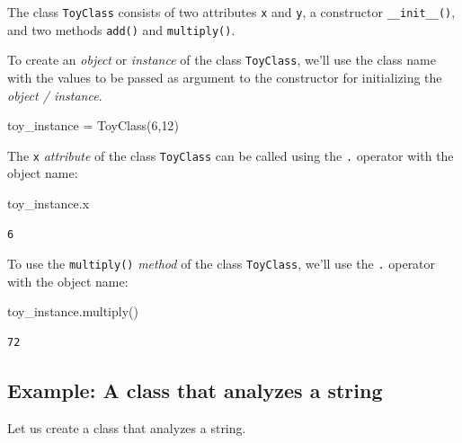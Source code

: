 \documentclass[
  letterpaper,
  DIV=11,
  numbers=noendperiod]{scrreprt}
\newenvironment{Shaded}{\begin{snugshade}}{\end{snugshade}}
\newcommand{\DecValTok}[1]{\textcolor[rgb]{0.68,0.00,0.00}{#1}}
\newcommand{\NormalTok}[1]{\textcolor[rgb]{0.00,0.23,0.31}{#1}}
\newcommand{\OperatorTok}[1]{\textcolor[rgb]{0.37,0.37,0.37}{#1}}
\begin{document}
The class \texttt{ToyClass} consists of two attributes \texttt{x} and
\texttt{y}, a constructor \texttt{\_\_init\_\_()}, and two methods
\texttt{add()} and \texttt{multiply()}.

To create an \emph{object} or \emph{instance} of the class
\texttt{ToyClass}, we'll use the class name with the values to be passed
as argument to the constructor for initializing the \emph{object /
instance}.

\begin{Shaded}
\begin{Highlighting}[]
\NormalTok{toy\_instance }\OperatorTok{=}\NormalTok{ ToyClass(}\DecValTok{6}\NormalTok{,}\DecValTok{12}\NormalTok{)}
\end{Highlighting}
\end{Shaded}

The \texttt{x} \emph{attribute} of the class \texttt{ToyClass} can be
called using the \texttt{.} operator with the object name:

\begin{Shaded}
\begin{Highlighting}[]
\NormalTok{toy\_instance.x}
\end{Highlighting}
\end{Shaded}

\begin{verbatim}
6
\end{verbatim}

To use the \texttt{multiply()} \emph{method} of the class
\texttt{ToyClass}, we'll use the \texttt{.} operator with the object
name:

\begin{Shaded}
\begin{Highlighting}[]
\NormalTok{toy\_instance.multiply()}
\end{Highlighting}
\end{Shaded}

\begin{verbatim}
72
\end{verbatim}

\hypertarget{example-a-class-that-analyzes-a-string}{%
\subsection{Example: A class that analyzes a
string}\label{example-a-class-that-analyzes-a-string}}

Let us create a class that analyzes a string.
\end{document}
